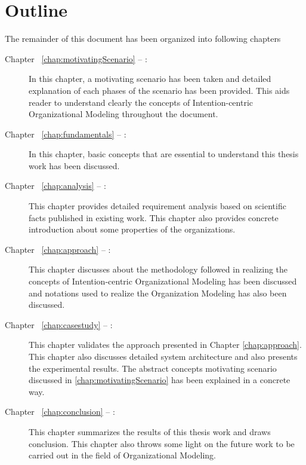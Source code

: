 \section {Outline}
\label{sec:outline}
The remainder of this document has been organized into following chapters
\begin{description}
	\item[Chapter ~\ref{chap:motivatingScenario} -- :] In this chapter, a motivating scenario has been taken and detailed explanation of each phases of the scenario has been provided. This aids reader to understand clearly the concepts of  Intention-centric Organizational Modeling throughout the document. 
	\item[Chapter ~\ref{chap:fundamentals} -- :] In this chapter, basic concepts that are essential to understand this thesis work has been discussed.
	\item[Chapter ~\ref{chap:analysis} -- :] This chapter provides detailed requirement analysis based on scientific facts published in existing work. This chapter also provides concrete introduction about some properties of the organizations.
	\item[Chapter ~\ref{chap:approach} -- :] This chapter discusses about the methodology followed in realizing the concepts  of Intention-centric Organizational Modeling has been discussed and notations used to realize the Organization Modeling has also been discussed.
	\item[Chapter ~\ref{chap:casestudy} -- :] This chapter validates the approach presented in Chapter \ref{chap:approach}. This chapter also discusses detailed system architecture and also presents the experimental results. The abstract concepts motivating scenario discussed in \ref{chap:motivatingScenario} has been explained in a concrete way.	
	\item[Chapter ~\ref{chap:conclusion} -- :] This chapter summarizes  the results of this thesis work and draws conclusion. This chapter also throws some light on the future work to be carried out in the field of Organizational Modeling. 
\end{description}